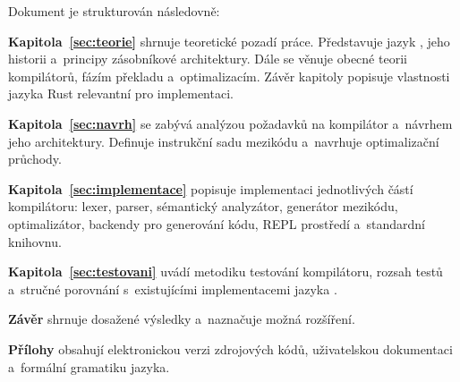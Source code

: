 Dokument je strukturován následovně:

\textbf{Kapitola~\ref{sec:teorie}} shrnuje teoretické pozadí práce.
Představuje jazyk \Forth{}, jeho historii a~principy zásobníkové architektury.
Dále se věnuje obecné teorii kompilátorů, fázím překladu a~optimalizacím.
Závěr kapitoly popisuje vlastnosti jazyka Rust relevantní pro implementaci.

\textbf{Kapitola~\ref{sec:navrh}} se zabývá analýzou požadavků
na kompilátor a~návrhem jeho architektury. Definuje instrukční sadu
mezikódu a~navrhuje optimalizační průchody.

\textbf{Kapitola~\ref{sec:implementace}} popisuje implementaci
jednotlivých částí kompilátoru: lexer, parser, sémantický analyzátor,
generátor mezikódu, optimalizátor, backendy pro generování kódu,
REPL prostředí a~standardní knihovnu.

\textbf{Kapitola~\ref{sec:testovani}} uvádí metodiku testování
kompilátoru, rozsah testů a~stručné porovnání s~existujícími
implementacemi jazyka \Forth{}.

\textbf{Závěr} shrnuje dosažené výsledky a~naznačuje možná rozšíření.

\textbf{Přílohy} obsahují elektronickou verzi zdrojových kódů,
uživatelskou dokumentaci a~formální gramatiku jazyka.
